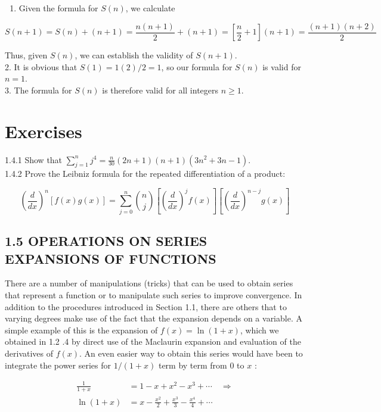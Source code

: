\documentclass[10pt]{article}
\begin{document}
\begin{enumerate}
  \item Given the formula for $S(n)$, we calculate
\end{enumerate}

$$
S(n+1)=S(n)+(n+1)=\frac{n(n+1)}{2}+(n+1)=\left[\frac{n}{2}+1\right](n+1)=\frac{(n+1)(n+2)}{2}
$$

Thus, given $S(n)$, we can establish the validity of $S(n+1)$.\\
2. It is obvious that $S(1)=1(2) / 2=1$, so our formula for $S(n)$ is valid for $n=1$.\\
3. The formula for $S(n)$ is therefore valid for all integers $n \geq 1$.

\section*{Exercises}
1.4.1 Show that $\sum_{j=1}^{n} j^{4}=\frac{n}{30}(2 n+1)(n+1)\left(3 n^{2}+3 n-1\right)$.\\
1.4.2 Prove the Leibniz formula for the repeated differentiation of a product:

$$
\left(\frac{d}{d x}\right)^{n}[f(x) g(x)]=\sum_{j=0}^{n}\binom{n}{j}\left[\left(\frac{d}{d x}\right)^{j} f(x)\right]\left[\left(\frac{d}{d x}\right)^{n-j} g(x)\right]
$$

\subsection*{1.5 OPERATIONS ON SERIES EXPANSIONS OF FUNCTIONS}
There are a number of manipulations (tricks) that can be used to obtain series that represent a function or to manipulate such series to improve convergence. In addition to the procedures introduced in Section 1.1, there are others that to varying degrees make use of the fact that the expansion depends on a variable. A simple example of this is the expansion of $f(x)=\ln (1+x)$, which we obtained in 1.2 .4 by direct use of the Maclaurin expansion and evaluation of the derivatives of $f(x)$. An even easier way to obtain this series would have been to integrate the power series for $1 /(1+x)$ term by term from 0 to $x$ :

$$
\begin{aligned}
\frac{1}{1+x} & =1-x+x^{2}-x^{3}+\cdots \quad \Longrightarrow \\
\ln (1+x) & =x-\frac{x^{2}}{2}+\frac{x^{3}}{3}-\frac{x^{4}}{4}+\cdots
\end{aligned}
$$
\end{document}
